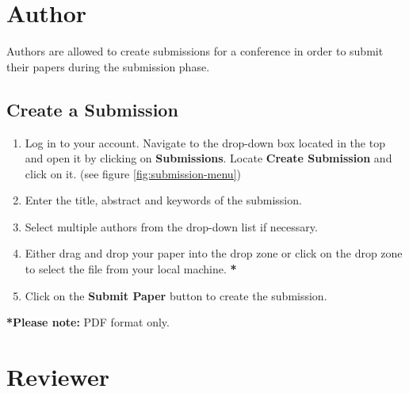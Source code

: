 \documentclass[nochapterpage,nopartpage,noheadingspace,numbersubsubsec,bigchapter,colorback,accentcolor=tud9c,10pt]{tudreport}
\begin{document}
  \chapter{Author}

Authors are allowed to create submissions for a conference in order to submit their papers during the submission phase.

	\section{Create a Submission}


\begin{enumerate}
	\item	Log in to your account. Navigate to the drop-down box located in the top and open it by clicking on \textbf{Submissions}. Locate \textbf{Create Submission} and click on it. (see figure \ref{fig:submission-menu})
	\item	Enter the title, abstract and keywords of the submission.
	\item	Select multiple authors from the drop-down list if necessary.
	\item	Either drag and drop your paper into the drop zone or click on the drop zone to select the file from your local machine. \textbf{*}
	\item	Click on the \textbf{Submit Paper} button to create the submission.
\end{enumerate}


\textbf{*Please note:} PDF format only.


  \chapter{Reviewer}
\end{document}
